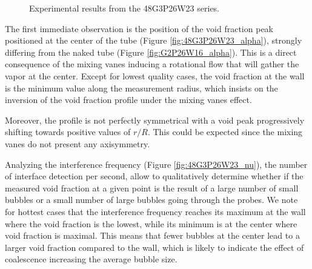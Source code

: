 \begin{figure}[!h]
\centering
{}

\caption{Experimental results from the 48G3P26W23 series.}
\label{fig:exp_48G3P26W23}
\end{figure}

\npar
The first immediate observation is the position of the void fraction peak positioned at the center of the tube (Figure \ref{fig:48G3P26W23_alpha}), strongly differing from the naked tube (Figure \ref{fig:G2P26W16_alpha}). This is a direct consequence of the mixing vanes inducing a rotational flow that will gather the vapor at the center. Except for lowest quality cases, the void fraction at the wall is the minimum value along the measurement radius, which insists on the inversion of the void fraction profile under the mixing vanes effect. 

Moreover, the profile is not perfectly symmetrical with a void peak progressively shifting towards positive values of $r/R$. This could be expected since the mixing vanes do not present any axisymmetry.

\npar

Analyzing the interference frequency (Figure \ref{fig:48G3P26W23_nu}), \ie the number of interface detection per second, allow to qualitatively determine whether if the measured void fraction at a given point is the result of a large number of small bubbles or a small number of large bubbles going through the probes. We note for hottest cases that the interference frequency reaches its maximum at the wall where the void fraction is the lowest, while its minimum is at the center where void fraction is maximal. This means that fewer bubbles at the center lead to a larger void fraction compared to the wall, which is likely to indicate the effect of coalescence increasing the average bubble size. 

